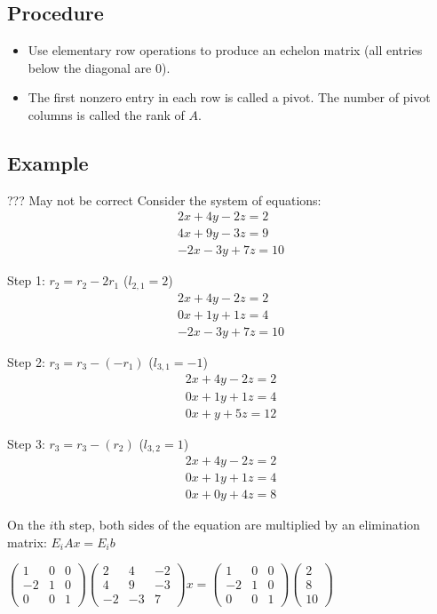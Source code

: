 \documentclass[12pt]{article}
\begin{document}
\subsection{Procedure}
\begin{itemize}
\item Use elementary row operations to produce an echelon matrix (all entries below the diagonal are 0).
\item The first nonzero entry in each row is called a pivot. The number of pivot columns is called the rank of $A$.
\end{itemize}

\subsection{Example}
??? May not be correct
Consider the system of equations:
\begin{align*}
2x + 4y - 2z = 2\\
4x + 9y - 3z = 9\\
-2x - 3y + 7z = 10
\end{align*}

Step 1: $r_2 = r_2 - 2r_1$ ($l_{2,1} = 2$)
\begin{align*}
2x + 4y - 2z = 2\\
0x + 1y + 1z = 4\\
-2x - 3y + 7z = 10
\end{align*}

Step 2: $r_3 = r_3 - (-r_1)$ ($l_{3,1} = -1$)
\begin{align*}
2x + 4y - 2z = 2\\
0x + 1y + 1z = 4\\
0x + y + 5z = 12
\end{align*}

Step 3: $r_3 = r_3 - (r_2)$ ($l_{3,2} = 1$)
\begin{align*}
2x + 4y - 2z = 2\\
0x + 1y + 1z = 4\\
0x + 0y + 4z = 8
\end{align*}

On the $i$th step, both sides of the equation are multiplied by an elimination matrix:
$E_i Ax = E_i b$

$
\begin{pmatrix}
1&0&0\\
-2&1&0\\
0&0&1 
\end{pmatrix}
\begin{pmatrix}
2&4&-2\\
4&9&-3\\
-2&-3&7
\end{pmatrix}
x = 
\begin{pmatrix}
1&0&0\\
-2&1&0\\
0&0&1 
\end{pmatrix}
\begin{pmatrix}
2\\
8\\
10
\end{pmatrix}
$
\end{document}
